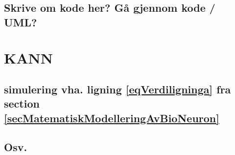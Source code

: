 	\subsection{Skrive om kode her? Gå gjennom kode / UML?}


\section{KANN}
	\subsection{simulering vha. ligning \eqref{eqVerdiligninga} fra section \ref{secMatematiskModelleringAvBioNeuron}}
	\subsection{Osv.}




